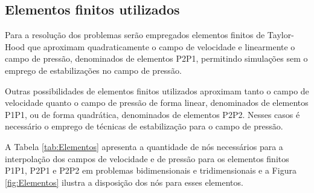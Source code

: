 

\subsection{Elementos finitos utilizados}

Para a resolução dos problemas serão empregados elementos finitos de Taylor-Hood que aproximam quadraticamente o campo de velocidade e linearmente o campo de pressão, denominados de elementos P2P1, permitindo simulações sem o emprego de estabilizações no campo de pressão.%

Outras possibilidades de elementos finitos utilizados aproximam tanto o campo de velocidade quanto o campo de pressão de forma linear, denominados de elementos P1P1, ou de forma quadrática, denominados de elementos P2P2. Nesses casos é necessário o emprego de técnicas de estabilização para o campo de pressão.

A Tabela \ref{tab:Elementos} apresenta a quantidade de nós necessários para a interpolação dos campos de velocidade e de pressão para os elementos finitos P1P1, P2P1 e P2P2 em problemas bidimensionais e tridimensionais e a Figura \ref{fig:Elementos} ilustra a disposição dos nós para esses elementos.

